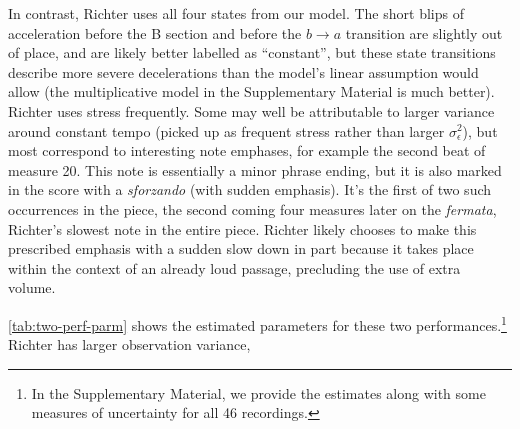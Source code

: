 \documentclass[aoas]{imsart}
\begin{document}
In contrast, Richter uses all four states from our model. The short
blips of acceleration before the B section and before the
$b \rightarrow a$ transition are slightly out of place, and are
likely better labelled as ``constant'', but these state transitions
describe more severe decelerations than the model's linear
assumption would allow (the multiplicative model in the Supplementary
Material is much better). Richter uses stress frequently. Some may well be
attributable to larger variance around constant tempo (picked up as
frequent stress rather than larger $\sigma^2_\epsilon$), but most
correspond to interesting note emphases, for example the second beat
of measure 20. This note is essentially a minor phrase ending, but it is
also marked in the score with a {\em sforzando} (with sudden
emphasis). It's the first of two such occurrences in the piece, the
second coming four measures later on the {\em fermata}, Richter's slowest
note in the entire piece. Richter likely chooses to make this
prescribed emphasis with a sudden slow down in part because it takes
place within the context of an already loud passage, precluding the
use of extra volume.
\begin{table}[tb]
  \centering
  \caption{The estimated parameters for performances by Richter and
    Hatto.}
\label{tab:two-perf-parm}
\end{table}
\autoref{tab:two-perf-parm} shows the estimated parameters for these
two performances.\footnote{In the Supplementary Material, we provide
  the estimates along with some measures of uncertainty for all 46
  recordings.} Richter has larger observation variance,
\end{document}
